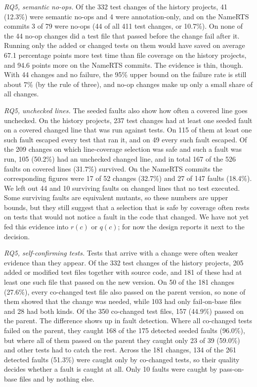 \documentclass[11pt]{article}
\begin{document}
\textit{RQ5, semantic no-ops.} Of the 332 test changes of the history projects, 41 (12.3\%) were semantic no-ops and 4 were annotation-only, and on the NameRTS commits 3 of 79 were no-ops (44 of all 411 test changes, or 10.7\%). On none of the 44 no-op changes did a test file that passed before the change fail after it. Running only the added or changed tests on them would have saved on average 67.1 percentage points more test time than file coverage on the history projects, and 94.6 points more on the NameRTS commits. The evidence is thin, though. With 44 changes and no failure, the 95\% upper bound on the failure rate is still about 7\% (by the rule of three), and no-op changes make up only a small share of all changes.

\textit{RQ5, unchecked lines.} The seeded faults also show how often a covered line goes unchecked. On the history projects, 237 test changes had at least one seeded fault on a covered changed line that was run against tests. On 115 of them at least one such fault escaped every test that ran it, and on 49 every such fault escaped. Of the 209 changes on which line-coverage selection was safe and such a fault was run, 105 (50.2\%) had an unchecked changed line, and in total 167 of the 526 faults on covered lines (31.7\%) survived. On the NameRTS commits the corresponding figures were 17 of 52 changes (32.7\%) and 27 of 147 faults (18.4\%). We left out 44 and 10 surviving faults on changed lines that no test executed. Some surviving faults are equivalent mutants, so these numbers are upper bounds, but they still suggest that a selection that is safe by coverage often rests on tests that would not notice a fault in the code that changed. We have not yet fed this evidence into $r(c)$ or $q(c)$; for now the design reports it next to the decision.

\textit{RQ5, self-confirming tests.} Tests that arrive with a change were often weaker evidence than they appear. Of the 332 test changes of the history projects, 205 added or modified test files together with source code, and 181 of these had at least one such file that passed on the new version. On 50 of the 181 changes (27.6\%), every co-changed test file also passed on the parent version, so none of them showed that the change was needed, while 103 had only fail-on-base files and 28 had both kinds. Of the 350 co-changed test files, 157 (44.9\%) passed on the parent. The difference shows up in fault detection. Where all co-changed tests failed on the parent, they caught 168 of the 175 detected seeded faults (96.0\%), but where all of them passed on the parent they caught only 23 of 39 (59.0\%) and other tests had to catch the rest. Across the 181 changes, 134 of the 261 detected faults (51.3\%) were caught only by co-changed tests, so their quality decides whether a fault is caught at all. Only 10 faults were caught by pass-on-base files and by nothing else.



\end{document}

